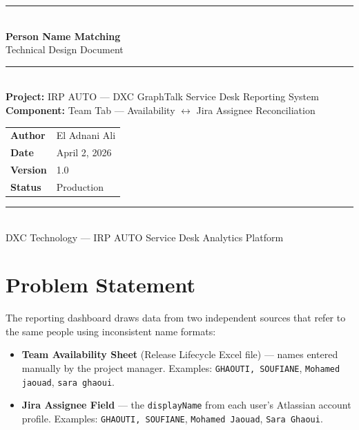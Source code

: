 \documentclass[12pt, a4paper]{article}
\begin{document}
\begin{titlepage}
    \centering
    \vspace*{2cm}
    {\color{dxcpurple}\rule{\linewidth}{1.5pt}}\\[0.5cm]
    {\Huge\bfseries\color{dxcpurple} Person Name Matching}\\[0.3cm]
    {\Large Technical Design Document}\\[0.3cm]
    {\color{dxcpurple}\rule{\linewidth}{1.5pt}}\\[2cm]

    {\large\textbf{Project:} IRP AUTO — DXC GraphTalk Service Desk Reporting System}\\[0.5cm]
    {\large\textbf{Component:} Team Tab — Availability $\leftrightarrow$ Jira Assignee Reconciliation}\\[2cm]

    \begin{tabular}{ll}
        \textbf{Author}  & El Adnani Ali \\[0.3cm]
        \textbf{Date}    & April 2, 2026 \\[0.3cm]
        \textbf{Version} & 1.0 \\[0.3cm]
        \textbf{Status}  & Production \\
    \end{tabular}

    \vfill
    {\color{dxcpurple}\rule{\linewidth}{0.4pt}}\\[0.2cm]
    {\small DXC Technology — IRP AUTO Service Desk Analytics Platform}
\end{titlepage}

\tableofcontents
\newpage

\section{Problem Statement}

The reporting dashboard draws data from two independent sources that refer to the same
people using inconsistent name formats:

\begin{itemize}
    \item \textbf{Team Availability Sheet} (Release Lifecycle Excel file) — names entered
          manually by the project manager. Examples: \texttt{GHAOUTI, SOUFIANE},
          \texttt{Mohamed jaouad}, \texttt{sara ghaoui}.

    \item \textbf{Jira Assignee Field} — the \texttt{displayName} from each user's
          Atlassian account profile. Examples: \texttt{GHAOUTI, SOUFIANE},
          \texttt{Mohamed Jaouad}, \texttt{Sara Ghaoui}.
\end{itemize}
\end{document}
